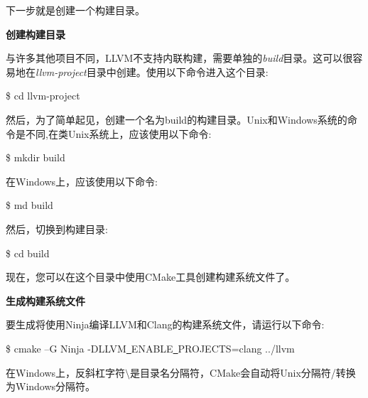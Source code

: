 下一步就是创建一个构建目录。\par

\hspace*{\fill} \par %
\textbf{创建构建目录}

与许多其他项目不同，LLVM不支持内联构建，需要单独的\textit{build}目录。这可以很容易地在\textit{llvm-project}目录中创建。使用以下命令进入这个目录:\par

\begin{tcolorbox}[colback=white,colframe=black]
	\$ cd llvm-project
\end{tcolorbox}

然后，为了简单起见，创建一个名为build的构建目录。Unix和Windows系统的命令是不同,在类Unix系统上，应该使用以下命令:\par

\begin{tcolorbox}[colback=white,colframe=black]
	\$ mkdir build
\end{tcolorbox}

在Windows上，应该使用以下命令:\par

\begin{tcolorbox}[colback=white,colframe=black]
	\$ md build
\end{tcolorbox}

然后，切换到构建目录:\par

\begin{tcolorbox}[colback=white,colframe=black]
	\$ cd build
\end{tcolorbox}

现在，您可以在这个目录中使用CMake工具创建构建系统文件了。\par

\hspace*{\fill} \par %
\textbf{生成构建系统文件}

要生成将使用Ninja编译LLVM和Clang的构建系统文件，请运行以下命令:\par

\begin{tcolorbox}[colback=white,colframe=black]
	\$ cmake –G Ninja -DLLVM\underline{~}ENABLE\underline{~}PROJECTS=clang ../llvm
\end{tcolorbox}

\begin{tcolorbox}[colback=blue!5!white,colframe=blue!75!black,title=Tip]
	在Windows上，反斜杠字符$\setminus$是目录名分隔符，CMake会自动将Unix分隔符/转换为Windows分隔符。
\end{tcolorbox}

